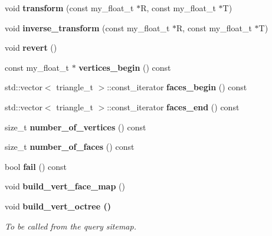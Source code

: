 \begin{CompactItemize}
\item 
void \textbf{transform} (const my\_\-float\_\-t $\ast$R, const my\_\-float\_\-t $\ast$T)\label{classASCbase_1_1SimpleTrimesh_62c0d274f674d05c9db0ca18aea2db11}

\item 
void \textbf{inverse\_\-transform} (const my\_\-float\_\-t $\ast$R, const my\_\-float\_\-t $\ast$T)\label{classASCbase_1_1SimpleTrimesh_5a59c678cf6712f29f796144cf8c87de}

\item 
void \textbf{revert} ()\label{classASCbase_1_1SimpleTrimesh_5310633ed75943845498b55b60793de5}

\item 
const my\_\-float\_\-t $\ast$ \textbf{vertices\_\-begin} () const \label{classASCbase_1_1SimpleTrimesh_0241ee914bc4009b298dcbf4f8509b0c}

\item 
std::vector$<$ triangle\_\-t $>$::const\_\-iterator \textbf{faces\_\-begin} () const \label{classASCbase_1_1SimpleTrimesh_a3884b72a389a2db888fdbfe87e9d18b}

\item 
std::vector$<$ triangle\_\-t $>$::const\_\-iterator \textbf{faces\_\-end} () const \label{classASCbase_1_1SimpleTrimesh_f460bb83919675913193bb8271b65b53}

\item 
size\_\-t \textbf{number\_\-of\_\-vertices} () const \label{classASCbase_1_1SimpleTrimesh_e5fa28939fe7b60139c77490226b7c19}

\item 
size\_\-t \textbf{number\_\-of\_\-faces} () const \label{classASCbase_1_1SimpleTrimesh_fb3840ef015be2eba2295d7527241687}

\item 
bool \textbf{fail} () const \label{classASCbase_1_1SimpleTrimesh_851505ebe0adff90db508c9f3f0e467f}

\item 
void \textbf{build\_\-vert\_\-face\_\-map} ()\label{classASCbase_1_1SimpleTrimesh_ec6e3af8fdf30ae9975017c727922700}

\item 
void \bf{build\_\-vert\_\-octree} ()\label{classASCbase_1_1SimpleTrimesh_e7086080fb8f55f239829a61ba081c21}

\begin{CompactList}\small\item\em To be called from the query sitemap. \item\end{CompactList}\end{CompactItemize}

